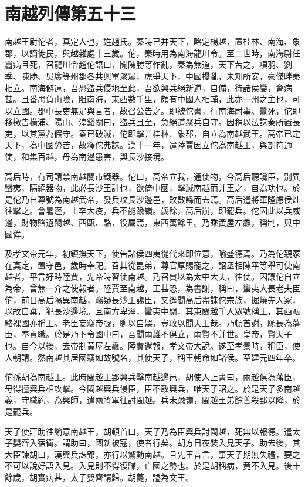 \chapter{南越列傳第五十三}

南越王尉佗者，真定人也，姓趙氏。秦時已并天下，略定楊越，置桂林、南海、象郡，以謫徙民，與越雜處十三歲。佗，秦時用為南海龍川令。至二世時，南海尉任囂病且死，召龍川令趙佗語曰，聞陳勝等作亂，秦為無道，天下苦之，項羽、劉季、陳勝、吳廣等州郡各共興軍聚眾，虎爭天下，中國擾亂，未知所安，豪傑畔秦相立。南海僻遠，吾恐盜兵侵地至此，吾欲興兵絕新道，自備，待諸侯變，會病甚。且番禺負山險，阻南海，東西數千里，頗有中國人相輔，此亦一州之主也，可以立國。郡中長吏無足與言者，故召公告之。即被佗書，行南海尉事。囂死，佗即移檄告橫浦、陽山、湟谿關曰，盜兵且至，急絕道聚兵自守。因稍以法誅秦所置長吏，以其黨為假守。秦已破滅，佗即擊并桂林、象郡，自立為南越武王。高帝已定天下，為中國勞苦，故釋佗弗誅。漢十一年，遣陸賈因立佗為南越王，與剖符通使，和集百越，毋為南邊患害，與長沙接境。

高后時，有司請禁南越關市鐵器。佗曰，高帝立我，通使物，今高后聽讒臣，別異蠻夷，隔絕器物，此必長沙王計也，欲倚中國，擊滅南越而并王之，自為功也。於是佗乃自尊號為南越武帝，發兵攻長沙邊邑，敗數縣而去焉。高后遣將軍隆慮侯灶往擊之。會暑溼，士卒大疫，兵不能踰嶺。歲餘，高后崩，即罷兵。佗因此以兵威邊，財物賂遺閩越、西甌、駱，役屬焉，東西萬餘里。乃乘黃屋左纛，稱制，與中國侔。

及孝文帝元年，初鎮撫天下，使告諸侯四夷從代來即位意，喻盛德焉。乃為佗親冢在真定，置守邑，歲時奉祀。召其從昆弟，尊官厚賜寵之。詔丞相陳平等舉可使南越者，平言好畤陸賈，先帝時習使南越。乃召賈以為太中大夫，往使。因讓佗自立為帝，曾無一介之使報者。陸賈至南越，王甚恐，為書謝，稱曰，蠻夷大長老夫臣佗，前日高后隔異南越，竊疑長沙王讒臣，又遙聞高后盡誅佗宗族，掘燒先人冢，以故自棄，犯長沙邊境。且南方卑溼，蠻夷中閒，其東閩越千人眾號稱王，其西甌駱裸國亦稱王。老臣妄竊帝號，聊以自娛，豈敢以聞天王哉。乃頓首謝，願長為藩臣，奉貢職。於是乃下令國中曰，吾聞兩雄不俱立，兩賢不并世。皇帝，賢天子也。自今以後，去帝制黃屋左纛。陸賈還報，孝文帝大說。遂至孝景時，稱臣，使人朝請。然南越其居國竊如故號名，其使天子，稱王朝命如諸侯。至建元四年卒。

佗孫胡為南越王。此時閩越王郢興兵擊南越邊邑，胡使人上書曰，兩越俱為藩臣，毋得擅興兵相攻擊。今閩越興兵侵臣，臣不敢興兵，唯天子詔之。於是天子多南越義，守職約，為興師，遣兩將軍往討閩越。兵未踰嶺，閩越王弟餘善殺郢以降，於是罷兵。

天子使莊助往諭意南越王，胡頓首曰，天子乃為臣興兵討閩越，死無以報德。遣太子嬰齊入宿衛。謂助曰，國新被寇，使者行矣。胡方日夜裝入見天子。助去後，其大臣諫胡曰，漢興兵誅郢，亦行以驚動南越。且先王昔言，事天子期無失禮，要之不可以說好語入見。入見則不得復歸，亡國之勢也。於是胡稱病，竟不入見。後十餘歲，胡實病甚，太子嬰齊請歸。胡薨，謚為文王。

